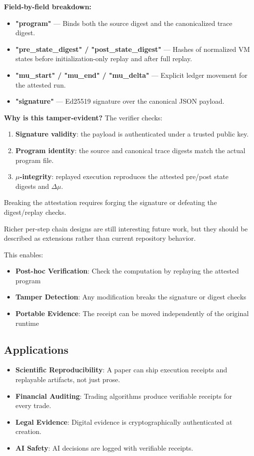 \textbf{Field-by-field breakdown:}
\begin{itemize}
    \item \textbf{"program"} — Binds both the source digest and the canonicalized trace digest.
    \item \textbf{"pre\_state\_digest" / "post\_state\_digest"} — Hashes of normalized VM states before initialization-only replay and after full replay.
    \item \textbf{"mu\_start" / "mu\_end" / "mu\_delta"} — Explicit ledger movement for the attested run.
    \item \textbf{"signature"} — Ed25519 signature over the canonical JSON payload.
\end{itemize}

\textbf{Why is this tamper-evident?} The verifier checks:
\begin{enumerate}
    \item \textbf{Signature validity}: the payload is authenticated under a trusted public key.
    \item \textbf{Program identity}: the source and canonical trace digests match the actual program file.
    \item \textbf{$\mu$-integrity}: replayed execution reproduces the attested pre/post state digests and $\Delta\mu$.
\end{enumerate}
Breaking the attestation requires forging the signature or defeating the digest/replay checks.

Richer per-step chain designs are still interesting future work, but they should be described as extensions rather than current repository behavior.

This enables:
\begin{itemize}
    \item \textbf{Post-hoc Verification}: Check the computation by replaying the attested program
    \item \textbf{Tamper Detection}: Any modification breaks the signature or digest checks
    \item \textbf{Portable Evidence}: The receipt can be moved independently of the original runtime
\end{itemize}

\subsection{Applications}

\begin{itemize}
    \item \textbf{Scientific Reproducibility}: A paper can ship execution receipts and replayable artifacts, not just prose.
    \item \textbf{Financial Auditing}: Trading algorithms produce verifiable receipts for every trade.
    \item \textbf{Legal Evidence}: Digital evidence is cryptographically authenticated at creation.
    \item \textbf{AI Safety}: AI decisions are logged with verifiable receipts.
\end{itemize}

